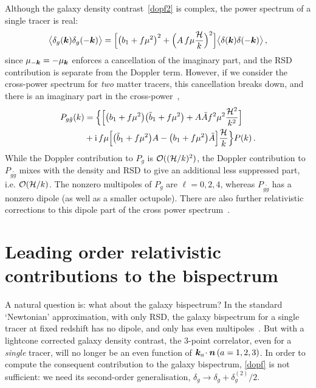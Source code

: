Although the galaxy density contrast~\eqref{dopf2} is complex, the power spectrum of a single tracer is real:
\begin{equation}\label{eq:pksingletracer}
\big\langle \delta_g(\bm {k})\delta_g(-\bm {k})\big\rangle
=\Big[ \big(b_{1} + f\mu^{2}\big)^2+\Big(A\,f \mu \frac{\mathcal{H}}{k}\Big)^2\Big] \big\langle \delta(\bm {k})\delta(-\bm {k})\big\rangle \,,
\end{equation}
since $\mu_{-\bm {k}}=-\mu_{\bm {k}}$ enforces a cancellation of the imaginary part, and the RSD contribution is separate from the Doppler term.
However, if we consider the cross-power spectrum for {\em two} matter tracers, this cancellation breaks down, and  there is an imaginary part in the cross-power~\citep{McDonald:2009dh,Bonvin:2014owa},
\begin{align}
P_{g \tilde g}(k)&= \Big\{\Big[ \big(b_{1} + f\mu^{2}\big)\big(\tilde b_{1} + f\mu^{2}\big)+A\tilde A f^2\mu^2 {\frac{\mathcal{H}^2}{k^2}}\Big]\nonumber\\
&
+\mathrm{i\,} f\mu\Big[\big(\tilde b_{1} + f\mu^{2}\big)A-\big(b_{1} + f\mu^{2}\big)\tilde A\Big]{\frac{\mathcal{H}}{k}} \Big\}P(k) \,.
\end{align}
While the Doppler contribution to $P_g$ is $\mathcal{O}((\mathcal{H}/k)^{2})$,  the Doppler contribution to $P_{g\tilde g}$ mixes with the density and RSD to give an additional less suppressed part, i.e. $\mathcal{O}(\mathcal{H}/k)$. The nonzero multipoles of $P_g$ are $\ell=0,2,4$, whereas  $P_{g \tilde g}$ has a nonzero dipole (as well as a smaller octupole).  There are also further relativistic corrections to this dipole part of the cross power spectrum~\citep{DiDio:2018zmk}.


\section{Leading order relativistic contributions to the bispectrum}

A natural question is: what about the galaxy bispectrum? In the standard `Newtonian' approximation, with only RSD, the galaxy bispectrum for a single tracer at fixed redshift has no dipole, and only has even multipoles~\citep{Scoccimarro:1999ed,Nan:2017oaq}. But with a lightcone corrected galaxy density contrast, the 3-point correlator, even for a {\em single} tracer, will no longer be an even function of $\bm {k}_a\!\cdot\bm {n} \,(a=1,2,3)$. In order to compute the consequent contribution to the galaxy bispectrum, \eqref{dopf} is not sufficient: we need its second-order generalisation, $\delta_g \to \delta_g+\delta^{(2)}_g/2$.

